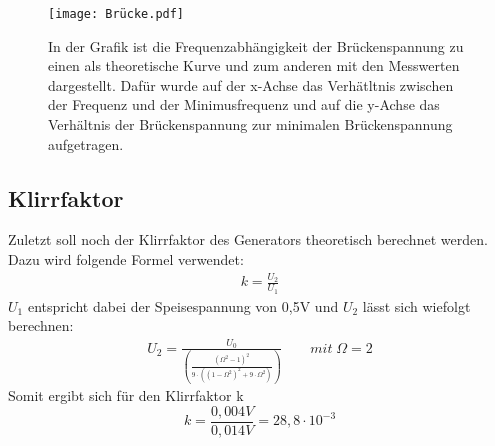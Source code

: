 \documentclass[titlepage = firstcover]{scrartcl}
\begin{document}
  \begin{figure}[h]
    \centering
    \texttt{[image: Brücke.pdf]}
    \caption{In der Grafik ist die Frequenzabhängigkeit der Brückenspannung zu einen als theoretische Kurve und zum anderen mit den Messwerten dargestellt. Dafür wurde auf der x-Achse das Verhätltnis zwischen der Frequenz und der Minimusfrequenz und auf die y-Achse das Verhältnis der Brückenspannung zur minimalen Brückenspannung aufgetragen.}
    \label{fig:Graph}
  \end{figure}

  \subsection{Klirrfaktor}
  Zuletzt soll noch der Klirrfaktor des Generators theoretisch berechnet werden. Dazu wird folgende Formel verwendet:
  \begin{align*}
    k = \frac{U_2}{U_1}
  \end{align*}
  $U_1$ entspricht dabei der Speisespannung von 0,5V und $U_2$ lässt sich wiefolgt berechnen:
  \begin{align*}
    U_2 = \frac{U_{\text{0}}}{\left(\frac{(\Omega ^2 - 1)^2}{9 \cdot ((1 - \Omega ^2)^2 + 9 \cdot \Omega ^2)}\right)} \qquad mit \; \Omega = 2
  \end{align*}
  Somit ergibt sich für den Klirrfaktor k
  \begin{equation*}
    k = \frac{0,004V}{0,014V} = 28,8 \cdot 10^{-3}
  \end{equation*}

\newpage
\end{document}
